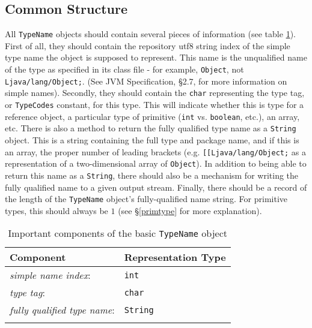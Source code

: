 \documentclass{report}
\begin{document}
\subsection{Common Structure}\label{type_common}


All \texttt{TypeName} objects should contain several pieces of information 
(see table \ref{typename_table}).
First of all, they should contain the repository utf8 string index of
the simple type name the object is supposed to represent.  This name is the 
unqualified name of the type as specified in its class file - for example,
\texttt{Object}, not \texttt{Ljava\//lang\//Object;}. (See JVM Specification,
\S 2.7, for more information on simple names). 
Secondly, they should contain the \texttt{char} representing the type tag, 
or \texttt{TypeCodes} constant, for this type. This will indicate whether 
this is type for a reference object, a particular type of primitive 
(\texttt{int} vs. \texttt{boolean}, etc.), an array, etc. There is also a 
method to return the fully 
qualified type name as a \texttt{String} object. This is a string containing 
the full type and package name, and if this is an array, the proper number of 
leading brackets (e.g. \texttt{[[Ljava\//lang\//Object;} as a representation of
a two-dimensional array of \texttt{Object}). In addition to 
being able to return this name as a \texttt{String}, there should also be a
mechanism for writing the fully qualified name to a given output stream. 
Finally, there should be a record of the length of the \texttt{TypeName}
object's fully-qualified name string. For primitive types, this should always
be $1$ (see \S \ref{primtype} for more explanation).

\begin{table}
\begin{center}
\begin{small}
\begin{tabular}{l l} 
	Component & Representation Type \\ \hline
	{\em simple name index}: & \texttt{int} \\
	{\em type tag}: & \texttt{char} \\
	{\em fully qualified type name}: & \texttt{String} \\
\label{typename_table}
\end{tabular}
\end{small}
\caption{Important components of the basic \texttt{TypeName} object}
\end{center}
\end{table}
\end{document}
